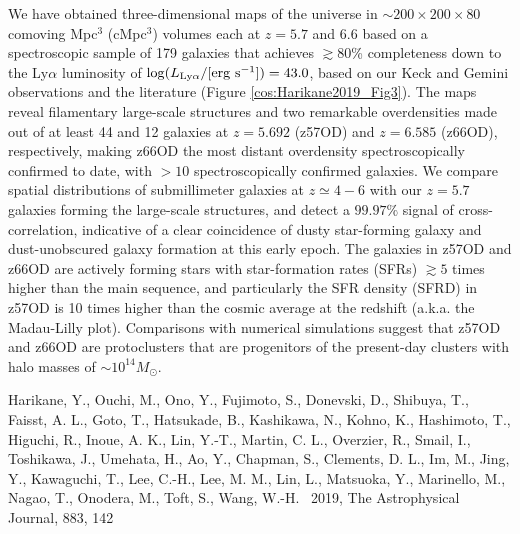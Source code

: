 We have obtained three-dimensional maps of the universe 
in $\sim200\times200\times80$ comoving Mpc$^3$ (cMpc$^3$) volumes each at $z=5.7$ and $6.6$ 
based on a spectroscopic sample of 179 galaxies that achieves $\gtrsim80$\% completeness 
down to the Ly$\alpha$ luminosity of $\log(L_{\rm Ly\alpha}/[\mathrm{erg\ s^{-1}}])=43.0$, 
based on our Keck and Gemini observations and the literature 
(Figure \ref{cos:Harikane2019_Fig3}).
The maps reveal filamentary large-scale structures and two remarkable overdensities 
made out of at least 44 and 12 galaxies at $z=5.692$ (z57OD) and $z=6.585$ (z66OD), respectively, 
making z66OD the most distant overdensity spectroscopically confirmed to date, 
with $>10$ spectroscopically confirmed galaxies.
We compare spatial distributions of submillimeter galaxies at $z\simeq 4-6$ 
with our $z=5.7$ galaxies forming the large-scale structures, 
and detect a $99.97\%$ signal of cross-correlation, 
indicative of a clear coincidence of dusty star-forming galaxy and dust-unobscured galaxy formation 
at this early epoch.
The galaxies in z57OD and z66OD are actively forming stars with star-formation rates (SFRs) 
$\gtrsim5$ times higher than the main sequence, 
and particularly the SFR density (SFRD) in z57OD is 10 times higher than the cosmic average 
at the redshift (a.k.a. the Madau-Lilly plot).
Comparisons with numerical simulations suggest that 
z57OD and z66OD are protoclusters that are progenitors of the present-day clusters 
with halo masses of $\sim10^{14} M_\odot$.



\begin{thebibliography}{9}
Harikane, Y., Ouchi, M., Ono, Y., Fujimoto, S., Donevski, D., Shibuya, T., Faisst, A. L., Goto, T., Hatsukade, B., Kashikawa, N., Kohno, K., Hashimoto, T., Higuchi, R., Inoue, A. K., Lin, Y.-T., Martin, C. L., Overzier, R., Smail, I., Toshikawa, J., Umehata, H., Ao, Y., Chapman, S., Clements, D. L., Im, M., Jing, Y., Kawaguchi, T., Lee, C.-H., Lee, M. M., Lin, L., Matsuoka, Y., Marinello, M., Nagao, T., Onodera, M., Toft, S., Wang, W.-H. 
\ 2019, 
The Astrophysical Journal, 883, 142 
\end{thebibliography}


